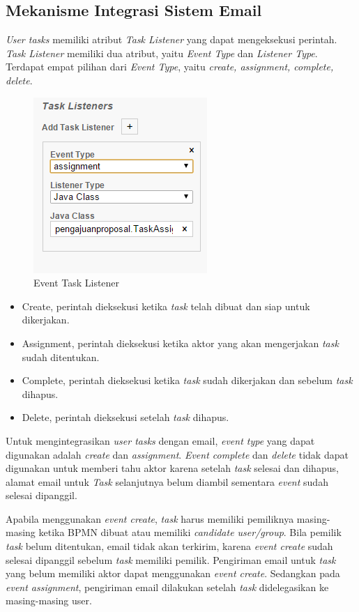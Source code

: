 \subsection{Mekanisme Integrasi Sistem Email}
\label{integrasi}
\textit{User tasks} memiliki atribut \textit{Task Listener} yang dapat mengeksekusi perintah. \textit{Task Listener} memiliki dua atribut, yaitu \textit{Event Type} dan \textit{Listener Type}. Terdapat empat pilihan dari \textit{Event Type}, yaitu \textit{create, assignment, complete, delete}. 
		\begin{figure}[H]
			\centering
			\includegraphics[scale=1]{Gambar/Bab-3/TaskListener}
			\caption{Event Task Listener} 
			\label{fig:eventtasklistener}
		\end{figure}
\begin{itemize}
	\item Create, perintah dieksekusi ketika \textit{task} telah dibuat dan siap untuk dikerjakan. 
	\item Assignment, perintah dieksekusi ketika aktor yang akan mengerjakan \textit{task} sudah ditentukan.
	\item Complete, perintah dieksekusi ketika \textit{task} sudah dikerjakan dan sebelum \textit{task} dihapus.
	\item Delete, perintah dieksekusi setelah \textit{task} dihapus.
\end{itemize}


Untuk mengintegrasikan \textit{user tasks} dengan email, \textit{event type} yang dapat digunakan adalah \textit{create} dan \textit{assignment}. \textit{Event complete} dan \textit{delete} tidak dapat digunakan untuk memberi tahu aktor karena setelah \textit{task} selesai dan dihapus, alamat email untuk \textit{Task} selanjutnya belum diambil sementara \textit{event} sudah selesai dipanggil.

Apabila menggunakan \textit{event create}, \textit{task} harus memiliki pemiliknya masing-masing ketika BPMN dibuat atau memiliki \textit{candidate user/group}. Bila pemilik \textit{task} belum ditentukan, email tidak akan terkirim, karena \textit{event create} sudah selesai dipanggil sebelum \textit{task} memiliki pemilik. Pengiriman email untuk \textit{task} yang belum memiliki aktor dapat menggunakan \textit{event create}. Sedangkan pada \textit{event assignment}, pengiriman email dilakukan setelah \textit{task} didelegasikan ke masing-masing user.





